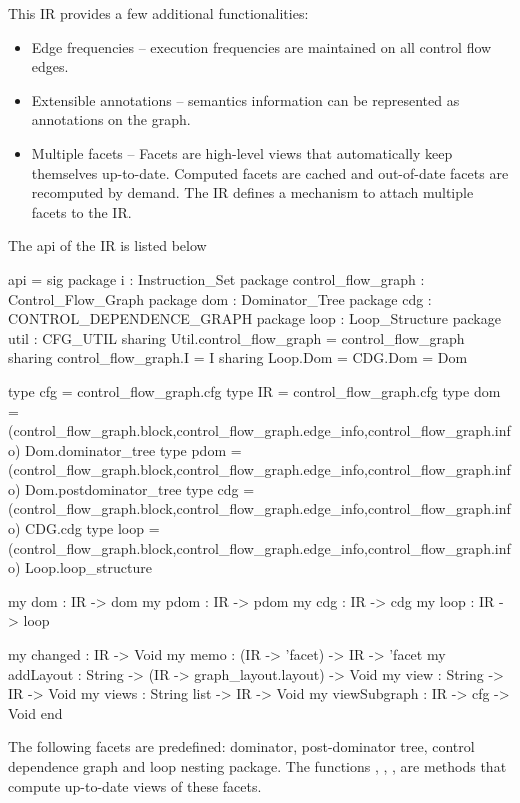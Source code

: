 This IR provides a few additional functionalities:
\begin{itemize}
  \item Edge frequencies -- execution frequencies
are maintained on all control flow edges.
  \item Extensible annotations -- semantics information can be 
       represented as annotations on the graph. 
  \item Multiple facets -- 
   Facets are high-level views that automatically keep themselves
up-to-date.  Computed facets are cached and out-of-date facets 
are recomputed by demand.
The IR defines a mechanism to attach multiple facets to the IR.
\end{itemize}

The api of the IR is listed below
\begin{SML}
 api  = sig
   package i    : Instruction_Set
   package control_flow_graph  : Control_Flow_Graph
   package dom  : Dominator_Tree
   package cdg  : CONTROL_DEPENDENCE_GRAPH
   package loop : Loop_Structure
   package util : CFG_UTIL
      sharing Util.control_flow_graph = control_flow_graph
      sharing control_flow_graph.I = I 
      sharing Loop.Dom = CDG.Dom = Dom
  
   type cfg  = control_flow_graph.cfg  
   type IR   = control_flow_graph.cfg  
   type dom  = (control_flow_graph.block,control_flow_graph.edge_info,control_flow_graph.info) Dom.dominator_tree
   type pdom = (control_flow_graph.block,control_flow_graph.edge_info,control_flow_graph.info) Dom.postdominator_tree
   type cdg  = (control_flow_graph.block,control_flow_graph.edge_info,control_flow_graph.info) CDG.cdg
   type loop = (control_flow_graph.block,control_flow_graph.edge_info,control_flow_graph.info) Loop.loop_structure
 
   my dom   : IR -> dom
   my pdom  : IR -> pdom
   my cdg   : IR -> cdg
   my loop  : IR -> loop

   my changed : IR -> Void  
   my memo : (IR -> 'facet) -> IR -> 'facet
   my addLayout : String -> (IR -> graph_layout.layout) -> Void
   my view : String -> IR -> Void      
   my views : String list -> IR -> Void      
   my viewSubgraph : IR -> cfg -> Void 
 end
\end{SML}

The following facets are predefined: dominator, post-dominator tree,
control dependence graph and loop nesting package.
The functions , , , 
are  methods that
compute up-to-date views of these facets.

